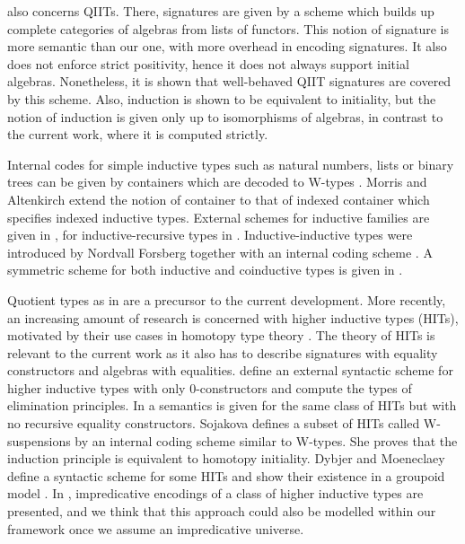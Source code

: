 \documentclass[acmsmall,review]{acmart}\settopmatter{printfolios=true,printccs=false,printacmref=false}
\begin{document}
\cite{altenkirch2018quotient} also concerns QIITs. There, signatures
are given by a scheme which builds up complete categories of algebras
from lists of functors. This notion of signature is more semantic than
our one, with more overhead in encoding signatures. It also does not
enforce strict positivity, hence it does not always support initial
algebras. Nonetheless, it is shown that well-behaved QIIT signatures
are covered by this scheme. Also, induction is shown to be equivalent
to initiality, but the notion of induction is given only up to
isomorphisms of algebras, in contrast to the current work, where it is
computed strictly.


Internal codes for simple inductive types such as natural numbers,
lists or binary trees can be given by containers which are decoded to
W-types \cite{abbot05containers}. Morris and Altenkirch
\cite{morris09indexed} extend the notion of container to that of
indexed container which specifies indexed inductive types. External
schemes for inductive families are given in
\cite{Dybjer97inductivefamilies,paulinmohring}, for
inductive-recursive types in \cite{dybjer00ir}. Inductive-inductive
types were introduced by Nordvall Forsberg together with an internal
coding scheme \cite{forsberg-phd}. A symmetric scheme for both
inductive and coinductive types is given in \cite{henning}.

Quotient types as in \cite{hofmann95extensional} are a precursor to
the current development. More recently, an increasing amount of
research is concerned with higher inductive types (HITs), motivated by
their use cases in homotopy type theory \cite{HoTTbook}. The theory of
HITs is relevant to the current work as it also has to describe
signatures with equality constructors and algebras with
equalities. \cite{niels} define an external syntactic scheme for
higher inductive types with only 0-constructors and compute the types
of elimination principles. In \cite{nielsmsc} a semantics is given for
the same class of HITs but with no recursive equality
constructors. Sojakova \cite{sojakova} defines a subset of HITs called
W-suspensions by an internal coding scheme similar to W-types. She
proves that the induction principle is equivalent to homotopy
initiality. Dybjer and Moeneclaey define a syntactic scheme for some
HITs and show their existence in a groupoid model
\cite{moeneclaey}. In \cite{AwodeyFS18}, impredicative encodings of a
class of higher inductive types are presented, and we think that this
approach could also be modelled within our framework once we assume an
impredicative universe.
\end{document}
